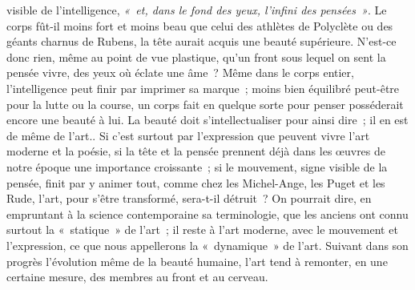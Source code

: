 \documentclass[french,twoside]{book} %
\begin{document}
visible  de l’intelligence, \emph{« et, dans le fond des yeux, l’infini des pensées »}. Le corps fût-il moins fort et moins beau que celui des athlètes de Polyclète ou des géants charnus de Rubens, la tête aurait acquis une beauté supérieure. N’est-ce donc rien, même au point de vue plastique, qu’un front sous lequel on sent la pensée vivre, des yeux où éclate une âme ? Même dans le corps entier, l’intelligence peut finir par imprimer sa marque ; moins bien équilibré peut-être pour la lutte ou la course, un corps fait en quelque sorte pour penser posséderait encore une beauté à lui. La beauté doit s’intellectualiser pour ainsi dire ; il en est de même de l’art.. Si c’est surtout par l’expression que peuvent vivre l’art moderne et la poésie, si la tête et la pensée prennent déjà dans les œuvres de notre époque une importance croissante ; si le mouvement, signe visible de la pensée, finit par y animer tout, comme chez les Michel-Ange, les Puget et les Rude, l’art, pour s’être transformé, sera-t-il détruit ? On pourrait dire, en empruntant à la science contemporaine sa terminologie, que les anciens ont connu surtout la « statique » de l’art ; il reste à l’art moderne, avec le mouvement et l’expression, ce que nous appellerons la « dynamique » de l’art. Suivant dans son progrès l’évolution même de la beauté humaine, l’art tend à remonter, en une certaine mesure, des membres au front et au cerveau.
\end{document}
